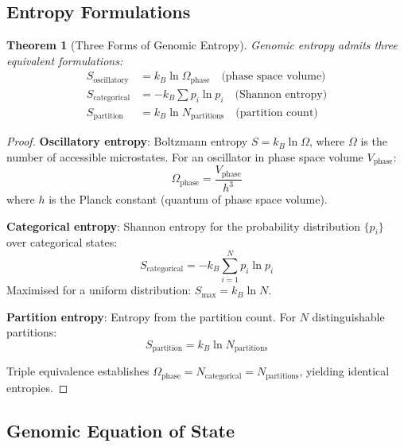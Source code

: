 \documentclass[11pt,a4paper]{article}
\newtheorem{theorem}{Theorem}[section]
\theoremstyle{remark}
\begin{document}
\subsection{Entropy Formulations}

\begin{theorem}[Three Forms of Genomic Entropy]
\label{thm:three_entropies}
Genomic entropy admits three equivalent formulations:
\begin{align}
S_{\text{oscillatory}} &= k_B\ln\Omega_{\text{phase}} \quad \text{(phase space volume)} \\
S_{\text{categorical}} &= -k_B\sum p_i\ln p_i \quad \text{(Shannon entropy)} \\
S_{\text{partition}} &= k_B\ln N_{\text{partitions}} \quad \text{(partition count)}
\end{align}
\end{theorem}

\begin{proof}
\textbf{Oscillatory entropy}: Boltzmann entropy $S = k_B\ln\Omega$, where $\Omega$ is the number of accessible microstates. For an oscillator in phase space volume $V_{\text{phase}}$:
\begin{equation}
\Omega_{\text{phase}} = \frac{V_{\text{phase}}}{h^3}
\end{equation}
where $h$ is the Planck constant (quantum of phase space volume).

\textbf{Categorical entropy}: Shannon entropy for the probability distribution $\{p_i\}$ over categorical states:
\begin{equation}
S_{\text{categorical}} = -k_B\sum_{i=1}^N p_i\ln p_i
\end{equation}
Maximised for a uniform distribution: $S_{\text{max}} = k_B\ln N$.

\textbf{Partition entropy}: Entropy from the partition count. For $N$ distinguishable partitions:
\begin{equation}
S_{\text{partition}} = k_B\ln N_{\text{partitions}}
\end{equation}

Triple equivalence establishes $\Omega_{\text{phase}} = N_{\text{categorical}} = N_{\text{partitions}}$, yielding identical entropies.
\end{proof}

\subsection{Genomic Equation of State}
\end{document}
